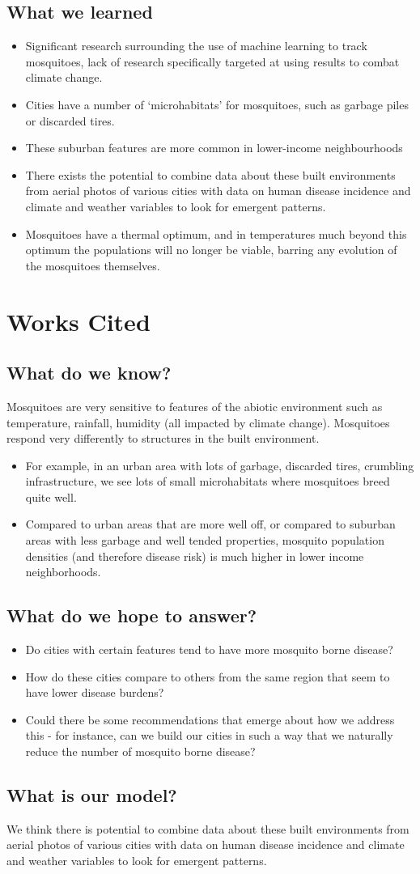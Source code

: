 \documentclass[11pt]{article}
\begin{document}
\subsection{What we learned}
\begin{itemize}
\item Significant research surrounding the use of machine learning to track mosquitoes, lack of research specifically targeted at using results to combat climate change.
\item Cities have a number of ‘microhabitats’ for mosquitoes, such as garbage piles or discarded tires. 
\item These suburban features are more common in lower-income neighbourhoods
\item There exists the potential to combine data about these built environments from aerial photos of various cities with data on human disease incidence and climate and weather variables to look for emergent patterns.
\item Mosquitoes have a thermal optimum, and in temperatures much beyond this optimum the populations will no longer be viable, barring any evolution of the mosquitoes themselves.
\end{itemize}

\section{Works Cited}
\subsection{What do we know?}
Mosquitoes are very sensitive to features of the abiotic environment such as temperature, rainfall, humidity (all impacted by climate change). Mosquitoes respond very differently to structures in the built environment.
\begin{itemize}
\item For example, in an urban area with lots of garbage, discarded tires, crumbling infrastructure, we see lots of small microhabitats where mosquitoes breed quite well. 
\item Compared to urban areas that are more well off, or compared to suburban areas with less garbage and well tended properties, mosquito population densities (and therefore disease risk) is much higher in lower income neighborhoods. 
\end{itemize}
\subsection{What do we hope to answer?}
\begin{itemize}
\item Do cities with certain features tend to have more mosquito borne disease?
\item How do these cities compare to others from the same region that seem to have lower disease burdens?
\item Could there be some recommendations that emerge about how we address this - for instance, can we build our cities in such a way that we naturally reduce the number of mosquito borne disease?
\end{itemize}
\subsection{What is our model?}
We think there is potential to combine data about these built environments from aerial photos of various cities with data on human disease incidence and climate and weather variables to look for emergent patterns.
\end{document}
